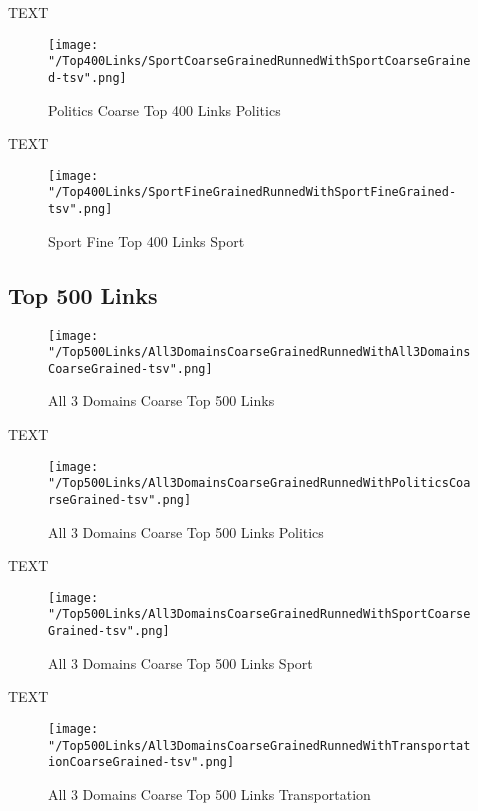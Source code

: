 \documentclass[thesis=M,english]{FITthesis}[2018/05/30]
\begin{document}
	
	TEXT

	\begin{figure}\centering
		\texttt{[image: "/Top400Links/SportCoarseGrainedRunnedWithSportCoarseGrained-tsv".png]}
		\caption{Politics Coarse Top 400 Links Politics}\label{}
	\end{figure}		
	
		TEXT	

	\begin{figure}\centering
		\texttt{[image: "/Top400Links/SportFineGrainedRunnedWithSportFineGrained-tsv".png]}
		\caption{Sport Fine Top 400 Links Sport}\label{}	
	\end{figure}

\subsection{Top 500 Links}

	\begin{figure}\centering
		\texttt{[image: "/Top500Links/All3DomainsCoarseGrainedRunnedWithAll3DomainsCoarseGrained-tsv".png]}
		\caption{All 3 Domains Coarse Top 500 Links}\label{}
	\end{figure}

	TEXT

	\begin{figure}\centering
		\texttt{[image: "/Top500Links/All3DomainsCoarseGrainedRunnedWithPoliticsCoarseGrained-tsv".png]}
		\caption{All 3 Domains Coarse Top 500 Links Politics}\label{}
	\end{figure}	

	TEXT	

	\begin{figure}\centering
		\texttt{[image: "/Top500Links/All3DomainsCoarseGrainedRunnedWithSportCoarseGrained-tsv".png]}
		\caption{All 3 Domains Coarse Top 500 Links Sport}\label{}
	\end{figure}
	
		TEXT	

	\begin{figure}\centering
		\texttt{[image: "/Top500Links/All3DomainsCoarseGrainedRunnedWithTransportationCoarseGrained-tsv".png]}
		\caption{All 3 Domains Coarse Top 500 Links Transportation}\label{}	
	\end{figure}
		
\end{document}

